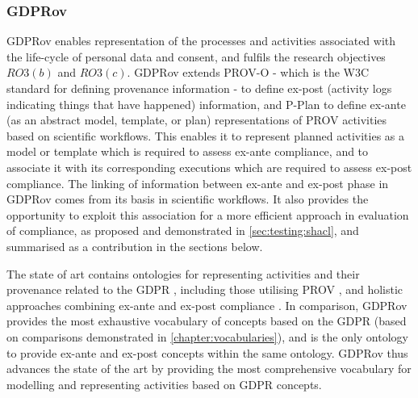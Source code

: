 \subsubsection{GDPRov}
GDPRov enables representation of the processes and activities associated with the life-cycle of personal data and consent, and  fulfils the research objectives $RO3(b)$ and $RO3(c)$.
GDPRov extends PROV-O \cite{lebo_prov-o_2013} - which is the W3C standard for defining provenance information - to define ex-post (activity logs indicating things that have happened) information, and P-Plan \cite{garijo_p-plan_2014} to define ex-ante (as an abstract model, template, or plan) representations of PROV activities based on scientific workflows.
This enables it to represent planned activities as a model or template which is required to assess ex-ante compliance, and to associate it with its corresponding executions which are required to assess ex-post compliance.
The linking of information between ex-ante and ex-post phase in GDPRov comes from its basis in scientific workflows. It also provides the opportunity to exploit this association for a more efficient approach in evaluation of compliance, as proposed and demonstrated in \autoref{sec:testing:shacl}, and summarised as a contribution in the sections below.

The state of art contains ontologies for representing activities and their provenance related to the GDPR \cite{pasquier_data_2018,palmirani_pronto_compliance_2018}, including those utilising PROV \cite{belhajjame_provenance_2018,bonatti_special_2018-1}, and holistic approaches combining ex-ante and ex-post compliance \cite{dullaert_d3.4_2019}.
In comparison, GDPRov provides the most exhaustive vocabulary of concepts based on the GDPR (based on comparisons demonstrated in \autoref{chapter:vocabularies}), and is the only ontology to provide ex-ante and ex-post concepts within the same ontology.
GDPRov thus advances the state of the art by providing the most comprehensive vocabulary for modelling and representing activities based on GDPR concepts.

